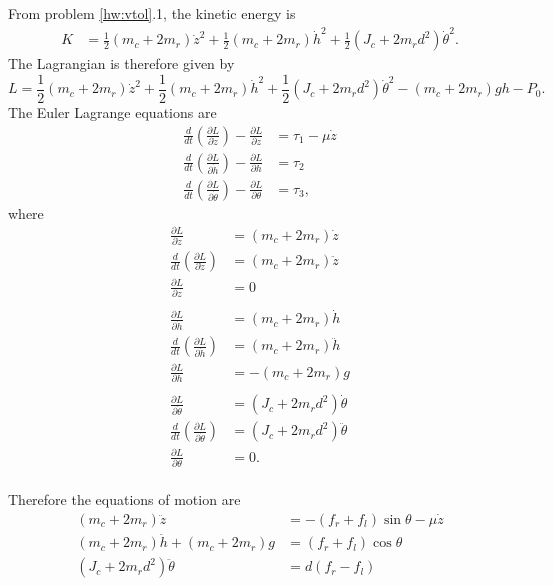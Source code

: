 From problem \ref{hw:vtol}.1, the kinetic energy is
\begin{align*}
  K &= \frac{1}{2} (m_c + 2 m_r) \dot{z}^2 + \frac{1}{2} (m_c + 2 m_r) \dot{h}^2 + \frac{1}{2}\left(J_c + 2 m_r d^2 \right) \dot{\theta}^2.
\end{align*}
The Lagrangian is therefore given by
\[
L = \frac{1}{2} (m_c + 2 m_r) \dot{z}^2 + \frac{1}{2} (m_c + 2 m_r) \dot{h}^2 + \frac{1}{2}(J_c + 2 m_r d^2 ) \dot{\theta}^2 - (m_c + 2 m_r) g h - P_0.
\]
The Euler Lagrange equations are
\begin{align*}
\frac{d}{dt} \left( \frac{\partial L}{\partial \dot{z}} \right) - \frac{\partial L}{\partial z} &= \tau_1 - \mu\dot{z} \\
\frac{d}{dt} \left( \frac{\partial L}{\partial \dot{h}} \right) - \frac{\partial L}{\partial h} &= \tau_2 \\
\frac{d}{dt} \left( \frac{\partial L}{\partial \dot{\theta}} \right) - \frac{\partial L}{\partial \theta} &= \tau_3,
\end{align*}
where
\begin{align*}
\frac{\partial L}{\partial \dot{z}} &= (m_c + 2 m_r) \dot{z} \\
\frac{d}{dt} \left( \frac{\partial L}{\partial \dot{z}} \right) &= (m_c + 2 m_r) \ddot{z} \\
\frac{\partial L}{\partial z} &= 0 \\
\\
\frac{\partial L}{\partial \dot{h}} &= (m_c + 2 m_r) \dot{h} \\
\frac{d}{dt} \left( \frac{\partial L}{\partial \dot{h}} \right) &= (m_c + 2 m_r) \ddot{h} \\
\frac{\partial L}{\partial h} &= - (m_c + 2 m_r) g\\
\\
\frac{\partial L}{\partial \dot{\theta}} &= (J_c + 2 m_r d^2) \dot{\theta} \\
\frac{d}{dt} \left( \frac{\partial L}{\partial \dot{\theta}} \right) &= (J_c + 2 m_r d^2) \ddot{\theta} \\
\frac{\partial L}{\partial \theta} &= 0. \\
\end{align*}

Therefore the equations of motion are
\begin{align*}
(m_c + 2 m_r) \ddot{z} &= -(f_r + f_l) \sin\theta - \mu \dot{z} \\
(m_c + 2 m_r) \ddot{h}  + (m_c + 2 m_r) g &= (f_r + f_l) \cos\theta \\
\left( J_c + 2 m_r d^2 \right) \ddot{\theta} &= d \left( f_r - f_l \right)
\end{align*}

